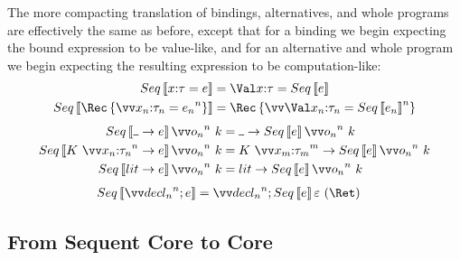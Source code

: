 \documentclass{article}
\begin{document}
The more compacting translation of bindings, alternatives, and whole programs
are effectively the same as before, except that for a binding we begin expecting
the bound expression to be value-like, and for an alternative and whole program
we begin expecting the resulting expression to be computation-like:
\begin{align*}
  Seq\trans{\nonrec{\ann x \ty = \expr}}
  &=
  \nonrec{\bindv{\ann x \ty}{Seq\trans{\expr}}}
  \\
  Seq\trans{\rec{\vect[n]{\ann{x_n}{\ty_n} = \expr_n}}}
  &=
  \rec{\vect[n]{\bindv{\ann{x_n}{\ty_n}}{Seq\trans{\expr_n}}}}
\end{align*}
\begin{align*}
  Seq\trans{\blank \to \expr} \vect[n]{\frm_n} ~ \ko
  &=
  \blank \to Seq\trans{\expr} \vect[n]{\frm_n} ~ \ko
  \\
  Seq\trans{K ~ \vect[n]{\ann{x_n}{\ty_n}} \to \expr} \vect[n]{\frm_n} ~ \ko
  &=
  K ~ \vect[m]{\ann{x_m}{\ty_m}}
  \to
  Seq\trans{\expr} \vect[n]{\frm_n} ~ \ko
  \\
  Seq\trans{\lit \to \expr} \vect[n]{\frm_n} ~ \ko
  &=
  \lit \to Seq\trans{\expr} \vect[n]{\frm_n} ~ \ko
\end{align*}
\begin{align*}
  Seq\trans{\vect[n]{\decl_n}; \expr}%
  &=
  \vect[n]{\decl_n}; Seq\trans{\expr} \mt ~ (\ret r)
\end{align*}

\subsection{From Sequent Core to Core}
\end{document}
